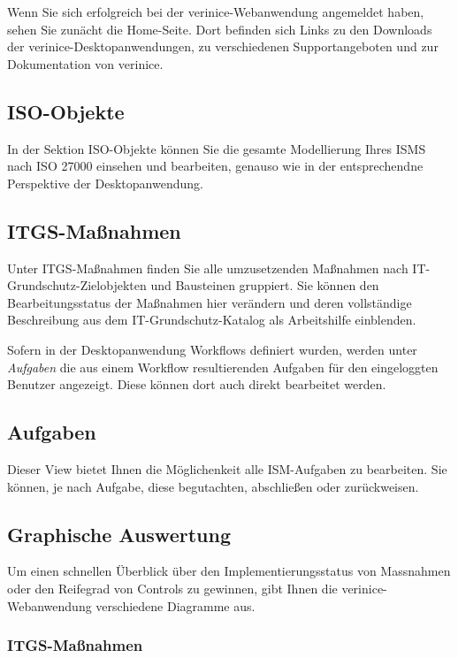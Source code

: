 \documentclass[a4paper,10pt]{book}
\begin{document}
Wenn Sie sich erfolgreich bei der verinice-Webanwendung angemeldet haben, sehen
Sie zunächt die Home-Seite. Dort befinden sich Links zu den Downloads der
verinice-Desktopanwendungen, zu verschiedenen Supportangeboten und zur
Dokumentation von verinice.


\subsection{ISO-Objekte}

In der Sektion ISO-Objekte können Sie die gesamte Modellierung Ihres ISMS nach
ISO 27000 einsehen und bearbeiten, genauso wie in der entsprechendne Perspektive
der Desktopanwendung.


\subsection{ITGS-Maßnahmen}

Unter ITGS-Maßnahmen finden Sie alle umzusetzenden Maßnahmen nach
IT-Grundschutz-Zielobjekten und Bausteinen gruppiert. Sie können den
Bearbeitungsstatus der Maßnahmen hier verändern und deren vollständige
Beschreibung aus dem IT-Grundschutz-Katalog als Arbeitshilfe einblenden.

Sofern in der Desktopanwendung Workflows definiert wurden, werden unter
\textit{Aufgaben} die aus einem Workflow resultierenden Aufgaben für den
eingeloggten Benutzer angezeigt. Diese können dort auch direkt bearbeitet
werden.


\subsection{Aufgaben}
\label{sec:aufgaben}

Dieser View bietet Ihnen die Möglichenkeit alle ISM-Aufgaben zu
bearbeiten. Sie können, je nach Aufgabe, diese begutachten,
abschließen oder zurückweisen.

\subsection{Graphische Auswertung}

Um einen schnellen Überblick über den Implementierungsstatus von
Massnahmen oder den Reifegrad von Controls zu gewinnen, gibt Ihnen die
verinice-Web\-an\-wendung verschiedene Diagramme aus.

\subsubsection{ITGS-Maßnahmen}
\label{sec:itgs-massnahmen}
\end{document}
